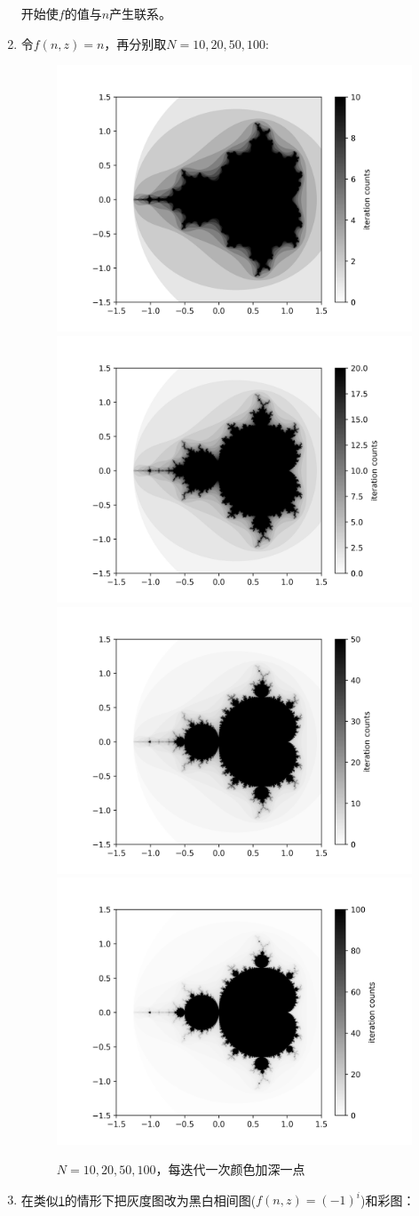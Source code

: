 \documentclass[a4paper]{ctexart}
\begin{document}
\begin{enumerate}
开始使$f$的值与$n$产生联系。
\item 令$f(n,z)=n$，再分别取$N=10,20,50,100$:
\begin{figure}[H]
	\centering
	\includegraphics[width=.45\textwidth]{./png/man_complex_n10.png}
	\includegraphics[width=.45\textwidth]{./png/man_complex_n20.png}
	\includegraphics[width=.45\textwidth]{./png/man_complex_n50.png}
	\includegraphics[width=.45\textwidth]{./png/man_complex_n100.png}
	\caption{$N=10,20,50,100$，每迭代一次颜色加深一点}
	\label{complex}
\end{figure}
\item 在类似\ref{complex}的情形下把灰度图改为黑白相间图($f(n,z)=(-1)^i$)和彩图：
\begin{figure}[H]

\end{figure}
\end{enumerate}
\end{document}
